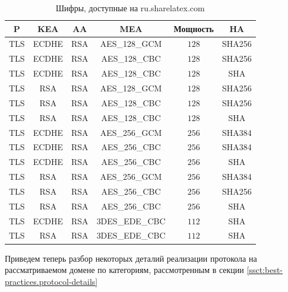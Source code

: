 \begin{table}[H]
    \centering
    \begin{tabular}{c|c|c|c|c|c}
        \textbf{P} & \textbf{KEA} & \textbf{AA} & \textbf{MEA} & \textbf{Мощность} & \textbf{HA} \\ 
        \hline
        TLS & ECDHE & RSA & AES\_128\_GCM & $128$ & SHA256 \\
        TLS & ECDHE & RSA & AES\_128\_CBC & $128$ & SHA256 \\
        TLS & ECDHE & RSA & AES\_128\_CBC & $128$ & SHA \\
        TLS & RSA & RSA & AES\_128\_GCM & $128$ & SHA256 \\
        TLS & RSA & RSA & AES\_128\_CBC & $128$ & SHA256 \\
        TLS & RSA & RSA & AES\_128\_CBC & $128$ & SHA \\
        TLS & ECDHE & RSA & AES\_256\_GCM & $256$ & SHA384 \\
        TLS & ECDHE & RSA & AES\_256\_CBC & $256$ & SHA384 \\
        TLS & ECDHE & RSA & AES\_256\_CBC & $256$ & SHA \\
        TLS & RSA & RSA & AES\_256\_GCM & $256$ & SHA384 \\
        TLS & RSA & RSA & AES\_256\_CBC & $256$ & SHA256 \\
        TLS & RSA & RSA & AES\_256\_CBC & $256$ & SHA \\
        TLS & ECDHE & RSA & 3DES\_EDE\_CBC & $112$ & SHA \\
        TLS & RSA & RSA & 3DES\_EDE\_CBC & $112$ & SHA \\
    \end{tabular}
    \caption{Шифры, доступные на ru.sharelatex.com}
    \label{tbl:03-cipher-suits}
\end{table}

Приведем теперь разбор некоторых деталий реализации протокола на рассматриваемом домене по категориям, рассмотренным в секции 
\ref{ssct:best-practices.protocol-details}

